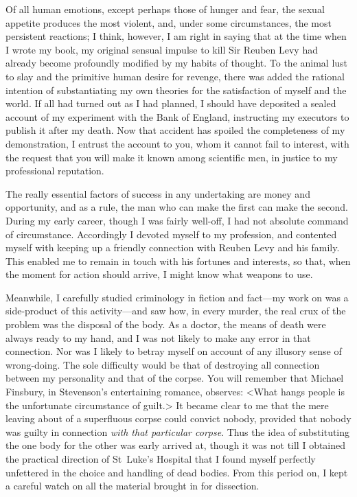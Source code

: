 Of all human emotions, except perhaps those of hunger and fear, the sexual appetite produces the most violent, and, under some circumstances, the most persistent reactions; I think, however, I am right in saying that at the time when I wrote my book, my original sensual impulse to kill Sir Reuben Levy had already become profoundly modified by my habits of thought. To the animal lust to slay and the primitive human desire for revenge, there was added the rational intention of substantiating my own theories for the satisfaction of myself and the world. If all had turned out as I had planned, I should have deposited a sealed account of my experiment with the Bank of England, instructing my executors to publish it after my death. Now that accident has spoiled the completeness of my demonstration, I entrust the account to you, whom it cannot fail to interest, with the request that you will make it known among scientific men, in justice to my professional reputation.

The really essential factors of success in any undertaking are money and opportunity, and as a rule, the man who can make the first can make the second. During my early career, though I was fairly well-off, I had not absolute command of circumstance. Accordingly I devoted myself to my profession, and contented myself with keeping up a friendly connection with Reuben Levy and his family. This enabled me to remain in touch with his fortunes and interests, so that, when the moment for action should arrive, I might know what weapons to use.

Meanwhile, I carefully studied criminology in fiction and fact—my work on  was a side-product of this activity—and saw how, in every murder, the real crux of the problem was the disposal of the body. As a doctor, the means of death were always ready to my hand, and I was not likely to make any error in that connection. Nor was I likely to betray myself on account of any illusory sense of wrong-doing. The sole difficulty would be that of destroying all connection between my personality and that of the corpse. You will remember that Michael Finsbury, in Stevenson's entertaining romance, observes: <What hangs people is the unfortunate circumstance of guilt.> It became clear to me that the mere leaving about of a superfluous corpse could convict nobody, provided that nobody was guilty in connection \emph{with that particular corpse}. Thus the idea of substituting the one body for the other was early arrived at, though it was not till I obtained the practical direction of St~Luke's Hospital that I found myself perfectly unfettered in the choice and handling of dead bodies. From this period on, I kept a careful watch on all the material brought in for dissection.

